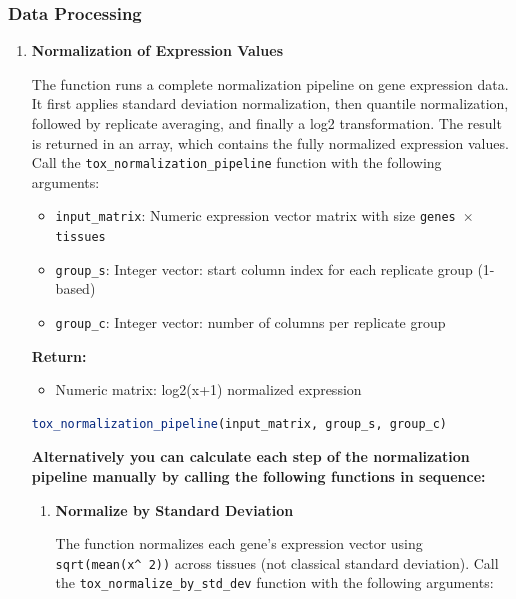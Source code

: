 \documentclass[11pt]{article}
\begin{document}
\subsubsection{Data Processing}
\begin{enumerate}
	\item \textbf{Normalization of Expression Values}
	      
	      The function runs a complete normalization pipeline on gene expression data.
	      It first applies standard deviation normalization, then quantile normalization,
	      followed by replicate averaging, and finally a log2 transformation. The
	      result is returned in an array, which contains the fully normalized expression
	      values. Call the \texttt{tox\_normalization\_pipeline} function with the following
	      arguments:
	      
	      \begin{itemize}
	      	\item \texttt{input\_matrix}: Numeric expression vector matrix with size
	      	      \texttt{genes $\times$ tissues}
	      	      
	      	\item \texttt{group\_s}: Integer vector: start column index for each
	      	      replicate group (1-based)
	      	      
	      	\item \texttt{group\_c}: Integer vector: number of columns per replicate
	      	      group
	      \end{itemize}
	      
	      \textbf{Return:}
	      \begin{itemize}
	      	\item Numeric matrix: log2(x+1) normalized expression
	      \end{itemize}
	      
	      \begin{lstlisting}[language=R, caption={R Normalization Pipeline}]
tox_normalization_pipeline(input_matrix, group_s, group_c)
	      \end{lstlisting}
	      
	      \textbf{Alternatively you can calculate each step of the normalization
	      pipeline manually by calling the following functions in sequence:}
	      \begin{enumerate}
	      	\item \textbf{Normalize by Standard Deviation}
	      	      
	      	      The function normalizes each gene's expression vector using \texttt{sqrt(mean(x\textasciicircum
	      	      	2))} across tissues (not classical standard deviation). Call the \texttt{tox\_normalize\_by\_std\_dev}
	      	      function with the following arguments:
	      	      

\end{enumerate}
\end{enumerate}
\end{document}

